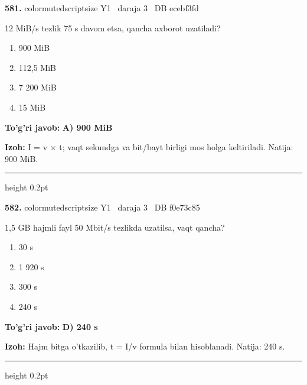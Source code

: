 \documentclass[10pt,a4paper,oneside]{article}
\begin{document}
\noindent\textbf{\color{ink}581.}  {color{muted}scriptsize Y1 \textbullet\ daraja 3 \textbullet\ DB ecebf3fd}
\par
12 MiB/s tezlik 75 s davom etsa, qancha axborot uzatiladi?
\begin{enumerate}[label=\Alph*),leftmargin=9mm]
\item 900 MiB
\item 112,5 MiB
\item 7 200 MiB
\item 15 MiB
\end{enumerate}
\begin{tcolorbox}[enhanced,breakable,colback=teal!4,colframe=teal!50!black,boxrule=0.5pt,arc=1.1mm,left=3mm,right=3mm,top=1.7mm,bottom=1.7mm,before skip=2mm,after skip=2mm]
\textbf{\color{teal}To'g'ri javob:} \textbf{A) 900 MiB}
\par\smallskip
\textbf{Izoh:} I = v \ensuremath{\times} t; vaqt sekundga va bit/bayt birligi mos holga keltiriladi. Natija: 900 MiB.
\end{tcolorbox}
\vspace{2mm}\hrule height 0.2pt \vspace{3mm}

\noindent\textbf{\color{ink}582.}  {color{muted}scriptsize Y1 \textbullet\ daraja 3 \textbullet\ DB f0e73c85}
\par
1,5 GB hajmli fayl 50 Mbit/s tezlikda uzatilsa, vaqt qancha?
\begin{enumerate}[label=\Alph*),leftmargin=9mm]
\item 30 s
\item 1 920 s
\item 300 s
\item 240 s
\end{enumerate}
\begin{tcolorbox}[enhanced,breakable,colback=teal!4,colframe=teal!50!black,boxrule=0.5pt,arc=1.1mm,left=3mm,right=3mm,top=1.7mm,bottom=1.7mm,before skip=2mm,after skip=2mm]
\textbf{\color{teal}To'g'ri javob:} \textbf{D) 240 s}
\par\smallskip
\textbf{Izoh:} Hajm bitga o'tkazilib, t = I/v formula bilan hisoblanadi. Natija: 240 s.
\end{tcolorbox}
\vspace{2mm}\hrule height 0.2pt \vspace{3mm}
\end{document}
